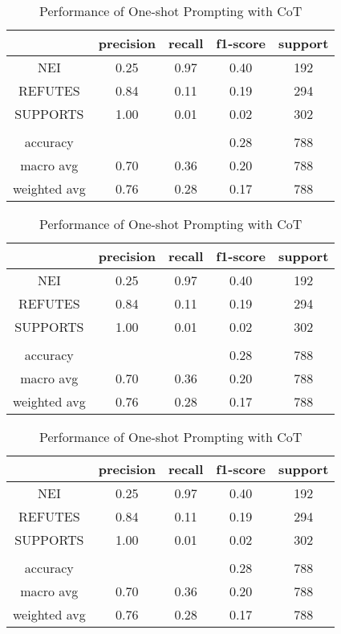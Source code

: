 \documentclass[11pt]{article}
\begin{document}
\begin{table}[ht]
    \centering
    \caption{Evaluation results}
    
    \caption*{Performance of Zero-shot Prompting}
    \begin{tabular}{c|c|c|c|c}
        \hline
         & precision & recall & f1-score & support \\
        \hline
        NEI & 0.25 & 0.97 & 0.40 & 192 \\
        REFUTES & 0.84 & 0.11 & 0.19 & 294 \\
        SUPPORTS & 1.00 & 0.01 & 0.02 & 302 \\
         &  &  &  & \\
        accuracy &  &  & 0.28 & 788 \\
        macro avg & 0.70 & 0.36 & 0.20 & 788 \\
        weighted avg & 0.76 & 0.28 & 0.17 & 788 \\
        \hline
    \end{tabular}
    \bigskip
    
    \caption*{Performance of One-shot Prompting}
    \begin{tabular}{c|c|c|c|c}
        \hline
         & precision & recall & f1-score & support \\
        \hline
        NEI & 0.25 & 0.97 & 0.40 & 192 \\
        REFUTES & 0.84 & 0.11 & 0.19 & 294 \\
        SUPPORTS & 1.00 & 0.01 & 0.02 & 302 \\
         &  &  &  & \\
        accuracy &  &  & 0.28 & 788 \\
        macro avg & 0.70 & 0.36 & 0.20 & 788 \\
        weighted avg & 0.76 & 0.28 & 0.17 & 788 \\
        \hline
    \end{tabular}
    \bigskip

    \caption*{Performance of One-shot Prompting with CoT}
    \begin{tabular}{c|c|c|c|c}
        \hline
         & precision & recall & f1-score & support \\
        \hline
        NEI & 0.25 & 0.97 & 0.40 & 192 \\
        REFUTES & 0.84 & 0.11 & 0.19 & 294 \\
        SUPPORTS & 1.00 & 0.01 & 0.02 & 302 \\
         &  &  &  & \\
        accuracy &  &  & 0.28 & 788 \\
        macro avg & 0.70 & 0.36 & 0.20 & 788 \\
        weighted avg & 0.76 & 0.28 & 0.17 & 788 \\
        \hline
    \end{tabular}
    
    \label{tab:result}
\end{table}
\end{document}
